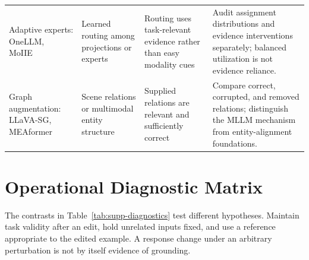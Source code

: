 \documentclass[10pt,onecolumn,journal,compsoc]{IEEEtran}
\begin{document}
\begin{table}[H]
\begin{tabularx}{\textwidth}{>{\raggedright\arraybackslash}p{}XXX}
Adaptive experts: OneLLM, MoIIE~\cite{han2024onellm,wang2025moiie} & Learned routing among projections or experts & Routing uses task-relevant evidence rather than easy modality cues & Audit assignment distributions and evidence interventions separately; balanced utilization is not evidence reliance.\\
Graph augmentation: LLaVA-SG, MEAformer~\cite{wang2024llavasg,chen2022meaformer} & Scene relations or multimodal entity structure & Supplied relations are relevant and sufficiently correct & Compare correct, corrupted, and removed relations; distinguish the MLLM mechanism from entity-alignment foundations.\\
\bottomrule
\end{tabularx}
\end{table}

\section{Operational Diagnostic Matrix}
The contrasts in Table~\ref{tab:supp-diagnostics} test different hypotheses. Maintain task validity after an edit, hold unrelated inputs fixed, and use a reference appropriate to the edited example. A response change under an arbitrary perturbation is not by itself evidence of grounding.
\end{document}
